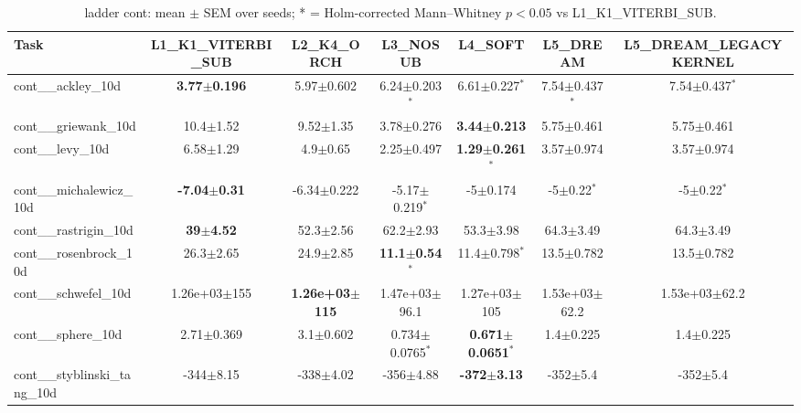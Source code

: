 \begin{table}[t]
\caption{ladder cont: mean $\pm$ SEM over seeds; * = Holm-corrected Mann--Whitney $p<0.05$ vs L1_K1_VITERBI_SUB.}
\label{tab:ladder_cont}
\begin{center}\small
\begin{tabular}{lcccccc}
\hline
Task & L1\_K1\_VITERBI\_SUB & L2\_K4\_ORCH & L3\_NOSUB & L4\_SOFT & L5\_DREAM & L5\_DREAM\_LEGACYKERNEL \\
\hline
cont\_\_ackley\_10d & \textbf{3.77$\pm$0.196} & 5.97$\pm$0.602 & 6.24$\pm$0.203$^{*}$ & 6.61$\pm$0.227$^{*}$ & 7.54$\pm$0.437$^{*}$ & 7.54$\pm$0.437$^{*}$ \\
cont\_\_griewank\_10d & 10.4$\pm$1.52 & 9.52$\pm$1.35 & 3.78$\pm$0.276 & \textbf{3.44$\pm$0.213} & 5.75$\pm$0.461 & 5.75$\pm$0.461 \\
cont\_\_levy\_10d & 6.58$\pm$1.29 & 4.9$\pm$0.65 & 2.25$\pm$0.497 & \textbf{1.29$\pm$0.261}$^{*}$ & 3.57$\pm$0.974 & 3.57$\pm$0.974 \\
cont\_\_michalewicz\_10d & \textbf{-7.04$\pm$0.31} & -6.34$\pm$0.222 & -5.17$\pm$0.219$^{*}$ & -5$\pm$0.174 & -5$\pm$0.22$^{*}$ & -5$\pm$0.22$^{*}$ \\
cont\_\_rastrigin\_10d & \textbf{39$\pm$4.52} & 52.3$\pm$2.56 & 62.2$\pm$2.93 & 53.3$\pm$3.98 & 64.3$\pm$3.49 & 64.3$\pm$3.49 \\
cont\_\_rosenbrock\_10d & 26.3$\pm$2.65 & 24.9$\pm$2.85 & \textbf{11.1$\pm$0.54}$^{*}$ & 11.4$\pm$0.798$^{*}$ & 13.5$\pm$0.782 & 13.5$\pm$0.782 \\
cont\_\_schwefel\_10d & 1.26e+03$\pm$155 & \textbf{1.26e+03$\pm$115} & 1.47e+03$\pm$96.1 & 1.27e+03$\pm$105 & 1.53e+03$\pm$62.2 & 1.53e+03$\pm$62.2 \\
cont\_\_sphere\_10d & 2.71$\pm$0.369 & 3.1$\pm$0.602 & 0.734$\pm$0.0765$^{*}$ & \textbf{0.671$\pm$0.0651}$^{*}$ & 1.4$\pm$0.225 & 1.4$\pm$0.225 \\
cont\_\_styblinski\_tang\_10d & -344$\pm$8.15 & -338$\pm$4.02 & -356$\pm$4.88 & \textbf{-372$\pm$3.13} & -352$\pm$5.4 & -352$\pm$5.4 \\
\hline
\end{tabular}
\end{center}
\end{table}